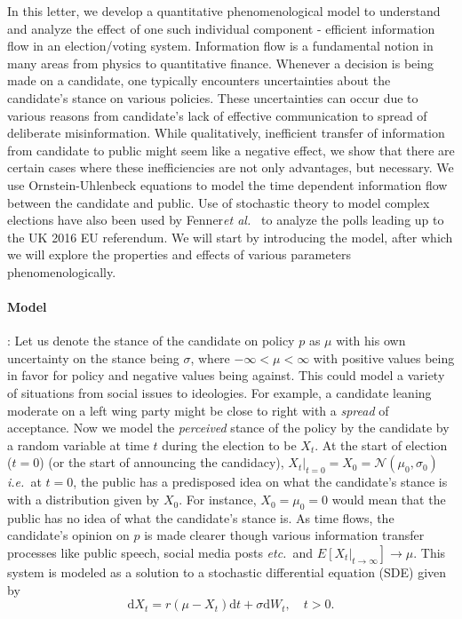\documentclass[aps,prl,twocolumn,showpacs,final]{revtex4-2}
\newcommand{\etal}{\textit{et al.\ }}
\newcommand{\ie}{\textit{i.e.\ }}
\newcommand{\etc}{\textit{etc.\ }}
\newcommand\at[2]{\left.#1\right|_{#2}}
\newcommand\pN{\mathcal{N}}
\begin{document}
In this letter, we develop a quantitative phenomenological model to understand and analyze the effect of one such individual component - efficient information flow in an election/voting system. Information flow is a fundamental notion in many areas from physics to quantitative finance. Whenever a decision is being made on a candidate, one typically encounters uncertainties about the candidate's stance on various policies. These uncertainties can occur due to various reasons from  candidate's lack of effective communication to spread of  deliberate misinformation. While qualitatively, inefficient transfer of information from candidate to public might seem like a negative effect, we show that there are certain cases where these inefficiencies are not only advantages, but necessary.  We use Ornstein-Uhlenbeck equations\cite{PhysRev.36.823} to model the time dependent information flow between the candidate and public. Use of stochastic theory to model complex elections have also been used by Fenner\etal \cite{fenner2018stochastic} to analyze the polls leading up to the UK 2016 EU referendum. We will start by introducing the model, after which we will explore the properties and effects of various parameters phenomenologically.


\paragraph*{Model}: Let us denote the stance of the candidate on policy $p$ as $\mu$ with his own uncertainty on the stance being $\sigma$, where $-\infty<\mu<\infty$ with positive values being in favor for policy and negative values being against. This could model a variety of situations from social issues to ideologies. For example, a candidate leaning moderate on a left wing party might be close to right with a \textit{spread} of acceptance. Now we model the \textit{perceived} stance of the policy by the candidate by a random variable at time $t$ during the election to be $X_t$. At the start of election ($t=0$) (or the start of announcing the candidacy), $\at{X_t}{t=0} = X_0=\pN(\mu_0,\sigma_0)$ \ie at $t=0$, the public has a predisposed idea on what the candidate's stance is with a distribution given by $X_0$. For instance, $X_0=\mu_0=0$ would mean that the public has no idea of what the candidate's stance is. As time flows, the candidate's opinion on $p$ is made clearer though various information transfer processes like public speech, social media posts \etc and $\at{E\left[X_t}{t\rightarrow\infty}\right]\rightarrow \mu$. This system is modeled as a solution to a stochastic differential equation (SDE) given by 
\begin{equation}
\mathrm{d} X_{t}=r\left(\mu-X_{t}\right) \mathrm{d} t+\sigma \mathrm{d} W_{t}, \quad t>0 \label{eq:1}. 
\end{equation}
\end{document}
